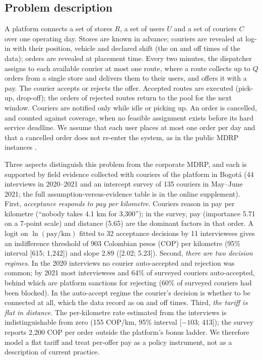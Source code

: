 \documentclass[a4paper,11pt,review,3p,authoryear]{elsarticle}
\begin{document}
\subsection{Problem description}
\label{sec:Problem_description}

A platform connects a set of stores $R$, a set of users $U$ and a set of couriers $C$ over one operating day. Stores are known in advance; couriers are revealed at log-in with their position, vehicle and declared shift (the on and off times of the data); orders are revealed at placement time. Every two minutes, the dispatcher assigns to each available courier at most one route, where a route collects up to $Q$ orders from a single store and delivers them to their users, and offers it with a pay. The courier accepts or rejects the offer. Accepted routes are executed (pick-up, drop-off); the orders of rejected routes return to the pool for the next window. Couriers are notified only while idle or picking up. An order is cancelled, and counted against coverage, when no feasible assignment exists before its hard service deadline. We assume that each user places at most one order per day and that a cancelled order does not re-enter the system, as in the public MDRP instances \citep{reyes2018meal}.

Three aspects distinguish this problem from the corporate MDRP, and each is supported by field evidence collected with couriers of the platform in Bogot\'a (44 interviews in 2020--2021 and an intercept survey of 135 couriers in May--June 2021; the full assumption-versus-evidence table is in the online supplement). First, \emph{acceptance responds to pay per kilometre}. Couriers reason in pay per kilometre (\enquote{nobody takes 4.1 km for 3{,}300}); in the survey, pay (importance 5.71 on a 7-point scale) and distance (5.65) are the dominant factors in that order. A logit on $\ln(\text{pay/km})$ fitted to 32 acceptance decisions by 11 interviewees gives an indifference threshold of 903 Colombian pesos (COP) per kilometre (95\% interval [615; 1{,}242]) and slope 2.89 ([2.02; 5.23]). Second, \emph{there are two decision regimes}. In the 2020 interviews no courier auto-accepted and rejection was common; by 2021 most interviewees and 64\% of surveyed couriers auto-accepted, behind which are platform sanctions for rejecting (60\% of surveyed couriers had been blocked). In the auto-accept regime the courier's decision is whether to be connected at all, which the data record as on and off times. Third, \emph{the tariff is flat in distance}. The per-kilometre rate estimated from the interviews is indistinguishable from zero (155 COP/km, 95\% interval [$-103$; 413]); the survey reports 2{,}200 COP per order outside the platform's bonus ladder. We therefore model a flat tariff and treat per-offer pay as a policy instrument, not as a description of current practice.
\end{document}
